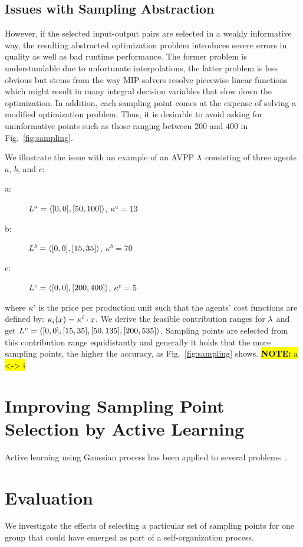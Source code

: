 \documentclass[conference]{IEEEtran}
\newcommand{\note}[1]{\sethlcolor{highlightblue} \hl{\textbf{NOTE:} #1}}
\newcommand{\fref}[1]{Fig.~\ref{#1}}
\begin{document}
\subsection{Issues with Sampling Abstraction}
However, if the selected input-output pairs are selected in a weakly informative way, the resulting abstracted
optimization problem introduces severe errors in quality as well as bad runtime performance. The former problem
is understandable due to unfortunate interpolations, the latter problem is less obvious but stems from the way MIP-solvers
resolve piecewise linear functions which might result in many integral decision variables that slow down the optimization.
In addition, each sampling point comes at the expense of solving a modified optimization problem. Thus, it is desirable
to avoid asking for uninformative points such as those ranging between $200$ and $400$ in \fref{fig:sampling}.

We illustrate the issue with an example of an AVPP $\lambda$ consisting of three agents $a$, $b$, and $c$:
%
\begin{description}
\item[a:] $L^a = \langle [0,0], [50, 100] \rangle$, $\kappa^a = 13$
\item[b:] $L^b = \langle [0,0], [15, 35] \rangle$, $\kappa^b = 70$
\item[c:] $L^c = \langle [0,0], [200, 400] \rangle$, $\kappa^c = 5$
\end{description}
where $\kappa^i$ is the price per production unit such that the agents' cost functions are defined by: $\kappa_{i}(x) = \kappa^i \cdot x$. We
derive the feasible contribution ranges for $\lambda$ and get $L^v = \langle [0, 0], [15, 35], [50, 135], [200, 535] \rangle$. 
Sampling points are selected from this contribution range equidistantly and generally it holds that the more sampling points, the higher the accuracy, 
as \fref{fig:sampling} shows. 
\note{a <-> i}

\section{Improving Sampling Point Selection by Active Learning}
Active learning using Gaussian process has been applied to several problems~\cite{Krause2007,Krause2008,Park2011}. 

\section{Evaluation}
We investigate the effects of selecting a particular set of 
sampling points for one group that could have emerged as part
of a self-organization process.





\end{document}
